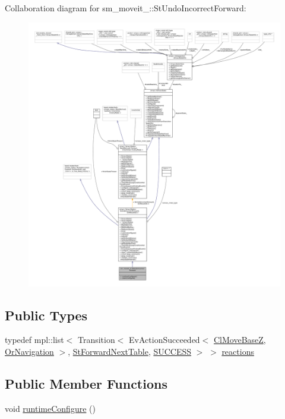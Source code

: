 Collaboration diagram for sm\+\_\+moveit\+\_\+:\+:St\+Undo\+Incorrect\+Forward\+:
\nopagebreak
\begin{figure}[H]
\begin{center}
\leavevmode
\includegraphics[width=350pt]{structsm__moveit__4_1_1StUndoIncorrectForward__coll__graph}
\end{center}
\end{figure}
\subsection*{Public Types}
\begin{DoxyCompactItemize}
\item 
typedef mpl\+::list$<$ Transition$<$ Ev\+Action\+Succeeded$<$ \hyperlink{classcl__move__base__z_1_1ClMoveBaseZ}{Cl\+Move\+BaseZ}, \hyperlink{classsm__moveit__4_1_1OrNavigation}{Or\+Navigation} $>$, \hyperlink{structsm__moveit__4_1_1StForwardNextTable}{St\+Forward\+Next\+Table}, \hyperlink{classSUCCESS}{S\+U\+C\+C\+E\+SS} $>$ $>$ \hyperlink{structsm__moveit__4_1_1StUndoIncorrectForward_ae566802c1b250af25670b65a8e748d8b}{reactions}
\end{DoxyCompactItemize}
\subsection*{Public Member Functions}
\begin{DoxyCompactItemize}
\item 
void \hyperlink{structsm__moveit__4_1_1StUndoIncorrectForward_adc443a7670abc6eeb09e5831b83bdd7e}{runtime\+Configure} ()
\end{DoxyCompactItemize}
